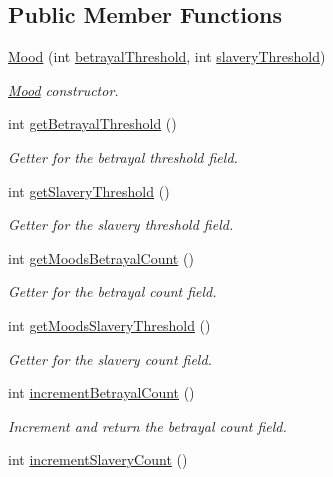 \subsection*{Public Member Functions}
\begin{DoxyCompactItemize}
\item 
\hyperlink{a00015_a2dc4d819a5cf692e3256c4a0cdb2805b}{Mood} (int \hyperlink{a00015_af8ba28f8a5e568f223c07e0acb788be9}{betrayal\-Threshold}, int \hyperlink{a00015_a12c9abed7c077f9013956cda08e41619}{slavery\-Threshold})
\begin{DoxyCompactList}\small\item\em \hyperlink{a00015}{Mood} constructor. \end{DoxyCompactList}\item 
int \hyperlink{a00015_a766902de5008b4ff54729075fe0b66a6}{get\-Betrayal\-Threshold} ()
\begin{DoxyCompactList}\small\item\em Getter for the betrayal threshold field. \end{DoxyCompactList}\item 
int \hyperlink{a00015_a8c5dda351cf131a2e2a30a1570e2c7e7}{get\-Slavery\-Threshold} ()
\begin{DoxyCompactList}\small\item\em Getter for the slavery threshold field. \end{DoxyCompactList}\item 
int \hyperlink{a00015_aae8ae123bc9d3bae48e08ad15528aa5b}{get\-Moods\-Betrayal\-Count} ()
\begin{DoxyCompactList}\small\item\em Getter for the betrayal count field. \end{DoxyCompactList}\item 
int \hyperlink{a00015_a859eb2f9bae00ce3604d0fea5a690900}{get\-Moods\-Slavery\-Threshold} ()
\begin{DoxyCompactList}\small\item\em Getter for the slavery count field. \end{DoxyCompactList}\item 
int \hyperlink{a00015_a322adb08d4a6f7dcd0eb00c77649d2d2}{increment\-Betrayal\-Count} ()
\begin{DoxyCompactList}\small\item\em Increment and return the betrayal count field. \end{DoxyCompactList}\item 
int \hyperlink{a00015_ac416312a82ad5afce4090858b47b0c96}{increment\-Slavery\-Count} ()

\end{DoxyCompactItemize}
